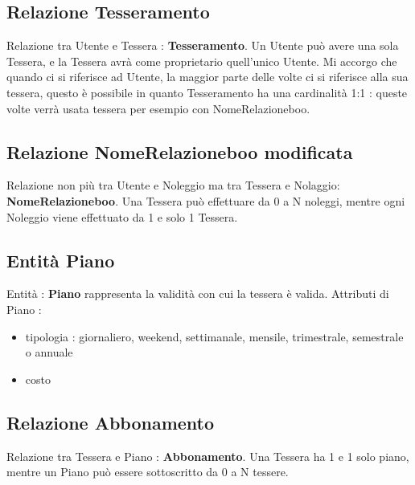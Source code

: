 \documentclass[a4paper,twoside]{article}
\begin{document}
\subsection{Relazione Tesseramento}
Relazione tra Utente e Tessera : \textbf{Tesseramento}.\newline
Un Utente può avere una sola Tessera, e la Tessera avrà come proprietario quell'unico Utente.\newline
Mi accorgo che quando ci si riferisce ad Utente, la maggior parte delle volte ci si riferisce alla sua tessera, questo è possibile in quanto Tesseramento ha una cardinalità 1:1 : queste volte verrà usata tessera per esempio con NomeRelazioneboo.

\subsection{Relazione NomeRelazioneboo modificata}
Relazione non più tra Utente e Noleggio ma tra Tessera e Nolaggio: \textbf{NomeRelazioneboo}.\newline
Una Tessera può effettuare da 0 a N noleggi, mentre ogni Noleggio viene effettuato da 1 e solo 1 Tessera.

\subsection{Entità Piano}
Entità : \textbf{Piano} rappresenta la validità con cui la tessera è valida.\newline
Attributi di Piano :
\begin{itemize}
 \item tipologia : giornaliero, weekend, settimanale, mensile, trimestrale, semestrale o annuale
 \item costo
\end{itemize}

\subsection{Relazione Abbonamento}
Relazione tra Tessera e Piano : \textbf{Abbonamento}.\newline
Una Tessera ha 1 e 1 solo piano, mentre un Piano può essere sottoscritto da 0 a N tessere.
\end{document}
